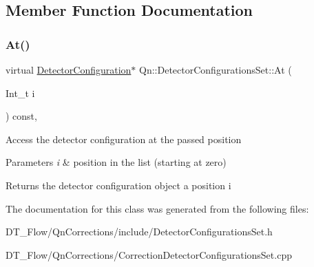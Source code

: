 \subsection{Member Function Documentation}
\mbox{\label{classQn_1_1DetectorConfigurationsSet_ac9f2135ccb4de759e8d870b5eaeca96a}} 
\subsubsection{\texorpdfstring{At()}{At()}}
{\footnotesize\ttfamily virtual \mbox{\hyperlink{classQn_1_1DetectorConfiguration}{Detector\+Configuration}}$\ast$ Qn\+::\+Detector\+Configurations\+Set\+::\+At (\begin{DoxyParamCaption}\item[{Int\+\_\+t}]{i }\end{DoxyParamCaption}) const\hspace{0.3cm}{\ttfamily [inline]}, {\ttfamily [virtual]}}

Access the detector configuration at the passed position 
\begin{DoxyParams}{Parameters}
{\em i} & position in the list (starting at zero) \\
\hline
\end{DoxyParams}
\begin{DoxyReturn}{Returns}
the detector configuration object a position i 
\end{DoxyReturn}


The documentation for this class was generated from the following files\+:\begin{DoxyCompactItemize}
\item 
D\+T\+\_\+\+Flow/\+Qn\+Corrections/include/Detector\+Configurations\+Set.\+h\item 
D\+T\+\_\+\+Flow/\+Qn\+Corrections/Correction\+Detector\+Configurations\+Set.\+cpp\end{DoxyCompactItemize}
